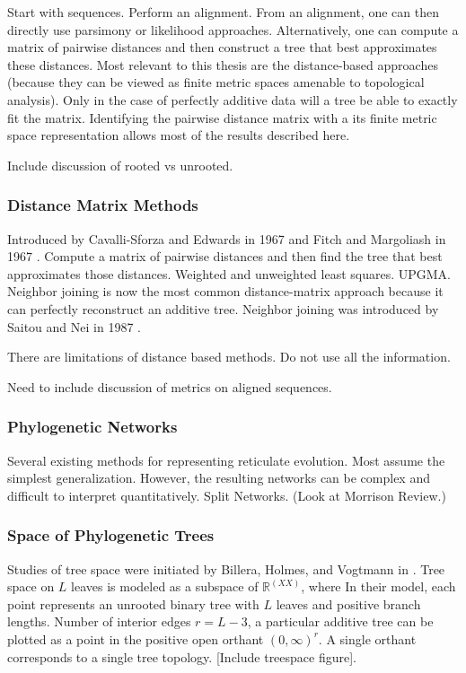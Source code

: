 Start with sequences.
Perform an alignment.
From an alignment, one can then directly use parsimony or likelihood approaches.
Alternatively, one can compute a matrix of pairwise distances and then construct a tree that best approximates these distances.
Most relevant to this thesis are the distance-based approaches (because they can be viewed as finite metric spaces amenable to topological analysis).
Only in the case of perfectly additive data will a tree be able to exactly fit the matrix.
Identifying the pairwise distance matrix with a its finite metric space representation allows most of the results described here.

Include discussion of rooted vs unrooted.

\subsubsection{Distance Matrix Methods}

Introduced by Cavalli-Sforza and Edwards in 1967 \cite{CavalliSforza:1967th} and Fitch and Margoliash in 1967 \cite{Fitch:1967we}.
Compute a matrix of pairwise distances and then find the tree that best approximates those distances.
Weighted and unweighted least squares.
UPGMA.
Neighbor joining is now the most common distance-matrix approach because it can perfectly reconstruct an additive tree.
Neighbor joining was introduced by Saitou and Nei in 1987 \cite{Saitou:1987wo}.

There are limitations of distance based methods.
Do not use all the information.

Need to include discussion of metrics on aligned sequences.

\subsubsection{Phylogenetic Networks}

Several existing methods for representing reticulate evolution.
Most assume the simplest generalization.
However, the resulting networks can be complex and difficult to interpret quantitatively.
Split Networks.
(Look at Morrison Review.)

\subsubsection{Space of Phylogenetic Trees}

Studies of tree space were initiated by Billera, Holmes, and Vogtmann in \cite{Billera:2001tv}.
Tree space on $L$ leaves is modeled as a subspace of $\mathbb{R}^{(XX)}$, where 
In their model, each point represents an unrooted binary tree with $L$ leaves and positive branch lengths.
Number of interior edges $r=L-3$, a particular additive tree can be plotted as a point in the positive open orthant $(0,\infty)^{r}$.
A single orthant corresponds to a single tree topology.
[Include treespace figure].

